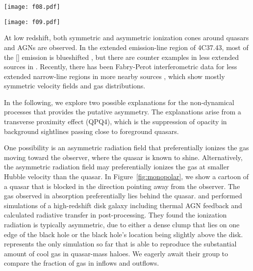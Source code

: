 \documentclass[iop]{emulateapj}
\begin{document}
\begin{SCfigure*}[10][!th]
\texttt{[image: f08.pdf]}
\caption{A cartoon showing a unipolar quasar. The gas observed in low- to intermediate-ion
absorption preferentially lies behind the quasar, and is shadowed from the ionizing radiation.}
\label{fig:monopolar}
\end{SCfigure*}
\begin{SCfigure*}[10][!bh]
\texttt{[image: f09.pdf]}
\caption{A cartoon showing the finite lifetime of quasar episodes as an explanation to the
asymmetric absorption. The setup on the left shows that the foreground quasar has not been shining
long enough for its ionizing radiation to reach the gas behind it, when the light from the
background quasar reaches. The setup on the right shows the scenario after an amount of time
comparable to the light travelling time across CGM scale. Gas in front of the foreground quasar
has been ionized, by the time the light from the background quasar reaches.}
\label{fig:lighttravel}
\end{SCfigure*}

At low redshift, both symmetric and asymmetric ionization cones around quasars and AGNs are
observed. In the extended emission-line region of 4C37.43, most of the [] emission is
blueshifted \citep{FuStockton07}, but there are counter examples in less extended sources in
\cite{FuStockton09}. Recently, there has been Fabry-Perot interferometric data for less extended
narrow-line regions in more nearby sources \citep{Keel+15,Keel+17}, which show mostly symmetric
velocity fields and gas distributions.

In the following, we explore two possible explanations for the non-dynamical processes that
provides the putative asymmetry.
The explanations arise from a transverse proximity effect (QPQ4), which is the suppression of
opacity in background sightlines passing close to foreground quasars.

One possibility is an asymmetric radiation field that preferentially ionizes the gas moving toward
the observer, where the quasar is known to shine. Alternatively, the asymmetric radiation field
may preferentially ionizes the gas at smaller Hubble velocity than the quasar. In
Figure~\ref{fig:monopolar}, we show a cartoon of a quasar that is blocked in the direction
pointing away from the observer. The gas observed in absorption preferentially lies behind the
quasar.
\cite{Roos+15} and \cite{GaborBournaud14} performed simulations of a high-redshift disk galaxy
including thermal AGN feedback and calculated radiative transfer in post-processing. They found
the ionization radiation is typically asymmetric, due to either a dense clump that lies on one
edge of the black hole or the black hole's location being slightly above the disk.
\cite{FaucherGiguere+16} represents the only simulation so far that is able to reproduce the
substantial amount of cool gas in quasar-mass haloes. We eagerly await their group to compare the
fraction of gas in inflows and outflows.
\end{document}
